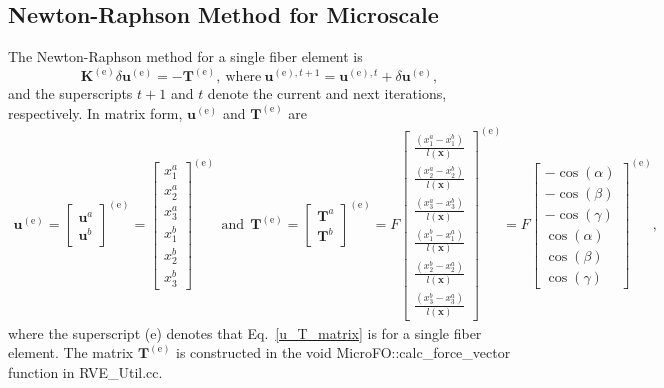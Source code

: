 \subsection{Newton-Raphson Method for Microscale}
\label{subsec:Newton_Microscale}

The Newton-Raphson method for a single fiber element is
%
\begin{equation}
\textbf{K}^{(\text{e})} \delta \textbf{u}^{(\text{e})} = - \textbf{T}^{(\text{e})}, \ \text{where} \ \textbf{u}^{(\text{e}),t+1}  = \textbf{u}^{(\text{e}),t} + \delta \textbf{u}^{(\text{e})},
\label{Newton_Raphson}
\end{equation}
%
and the superscripts $t+1$ and $t$ denote the current and next iterations, respectively. In matrix form, $\textbf{u}^{(\text{e})}$ and $\textbf{T}^{(\text{e})}$ are
%
\begin{eqnarray}
\textbf{u}^{(\text{e})} = 
\begin{bmatrix}
\textbf{u}^a \\ \textbf{u}^b
\end{bmatrix}^{(\text{e})} =
%
\begin{bmatrix}
x^a_1 \\ x^a_2 \\ x^a_3 \\ x^b_1 \\ x^b_2 \\ x^b_3
\end{bmatrix}^{(\text{e})} \ \ \text{and} \ \
\textbf{T}^{(\text{e})} = 
\begin{bmatrix}
\textbf{T}^a \\ \textbf{T}^b
\end{bmatrix}^{(\text{e})} =
%
F\begin{bmatrix}
\frac{(x^a_1 - x^b_1)}{l(\textbf{x})} \\ \frac{(x^a_2 - x^b_2)}{l(\textbf{x})} \\ \frac{(x^a_3 - x^b_3)}{l(\textbf{x})} \\ \frac{(x^b_1 - x^a_1)}{l(\textbf{x})} \\ \frac{(x^b_2 - x^a_2)}{l(\textbf{x})} \\ \frac{(x^b_3 - x^a_3)}{l(\textbf{x})}
\end{bmatrix}^{(\text{e})} = 
%
F\begin{bmatrix}
-\cos(\alpha) \\ -\cos(\beta) \\ -\cos(\gamma) \\ \cos(\alpha) \\ \cos(\beta) \\ \cos(\gamma)
\end{bmatrix}^{(\text{e})} ,
\label{u_T_matrix}
\end{eqnarray}
%
where the superscript (e) denotes that Eq.\ \eqref{u_T_matrix} is for a single fiber element. The matrix $\textbf{T}^{(\text{e})}$ is constructed in the void MicroFO::calc\_force\_vector function in RVE\_Util.cc. 


